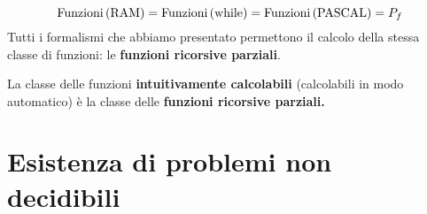 \documentclass{lectures}
\begin{document}
\begin{theorem}
\[
    \text{Funzioni}\left(\text{RAM}\right) = \text{Funzioni}\left(\text{while}\right) = \text{Funzioni}\left(\text{PASCAL}\right) = P_f
\]
Tutti i formalismi che abbiamo presentato permettono il calcolo della stessa classe di funzioni: le \textbf{funzioni ricorsive parziali}.
\end{theorem}
\begin{theorem}
    La classe delle funzioni \textbf{intuitivamente calcolabili} (calcolabili in modo automatico) è la classe delle \textbf{funzioni ricorsive parziali.}
\end{theorem}

\chapter{Esistenza di problemi non decidibili}
\end{document}
